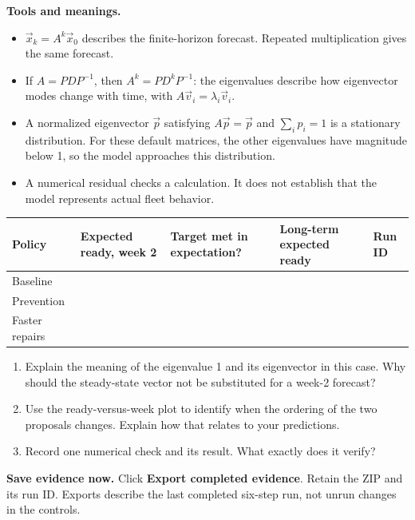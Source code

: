 \documentclass[10pt,letterpaper]{article}
\newcommand{\spacefor}[1]{\vspace{#1}}
\begin{document}
\textbf{Tools and meanings.}
\begin{itemize}[nosep]
\item $\vec{x}_k=A^k\vec{x}_0$ describes the finite-horizon forecast. Repeated multiplication gives the same forecast.
\item If $A=PDP^{-1}$, then $A^k=PD^kP^{-1}$: the eigenvalues describe how eigenvector modes change with time, with $A\vec{v}_i=\lambda_i\vec{v}_i$.
\item A normalized eigenvector $\vec{p}$ satisfying $A\vec{p}=\vec{p}$ and $\sum_i p_i=1$ is a stationary distribution. For these default matrices, the other eigenvalues have magnitude below 1, so the model approaches this distribution.
\item A numerical residual checks a calculation. It does not establish that the model represents actual fleet behavior.
\end{itemize}
\begin{center}
\begin{tabularx}{\textwidth}{lYYYY}
\toprule
Policy & Expected ready, week 2 & Target met in expectation? & Long-term expected ready & Run ID\\
\midrule
Baseline &&&&\\[0.3in]
Prevention &&&&\\[0.3in]
Faster repairs &&&&\\[0.3in]
\bottomrule
\end{tabularx}
\end{center}
\begin{enumerate}[label=(\alph*),nosep]
\item Explain the meaning of the eigenvalue 1 and its eigenvector in this case. Why should the steady-state vector not be substituted for a week-2 forecast?
\spacefor{0.55in}
\item Use the ready-versus-week plot to identify when the ordering of the two proposals changes. Explain how that relates to your predictions.
\spacefor{0.45in}
\item Record one numerical check and its result. What exactly does it verify?
\spacefor{0.4in}
\end{enumerate}
\textbf{Save evidence now.} Click \textbf{Export completed evidence}. Retain the ZIP and its run ID. Exports describe the last completed six-step run, not unrun changes in the controls.

\newpage
\end{document}
